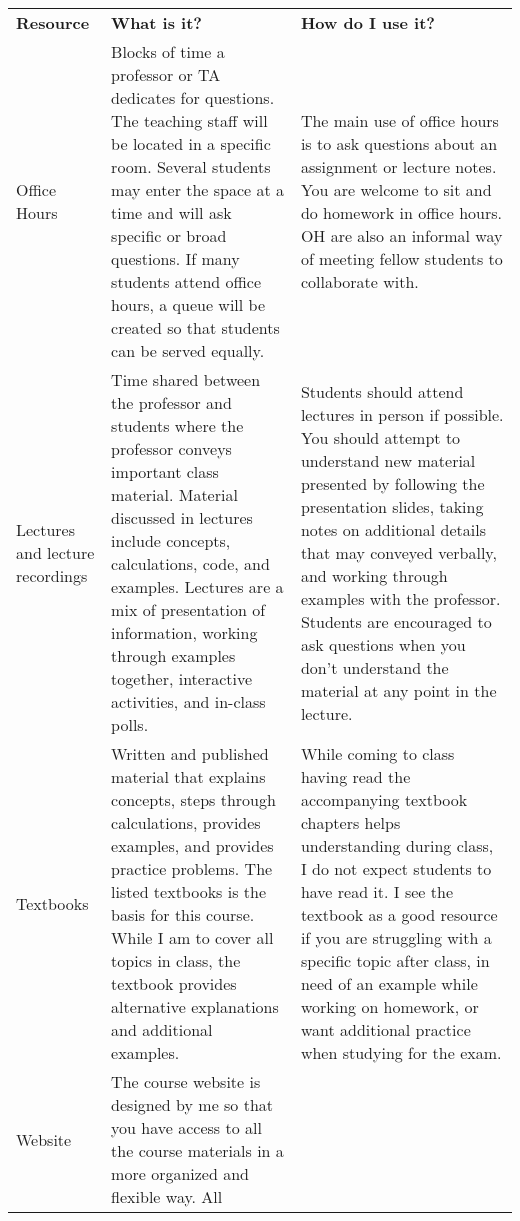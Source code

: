 \documentclass[
  letterpaper,
  DIV=11,
  numbers=noendperiod]{scrartcl}
\begin{document}
\begin{longtable}[]{@{}
  >{\centering\arraybackslash}p{}
  >{\raggedright\arraybackslash}p{}
  >{\raggedright\arraybackslash}p{}@{}}
\toprule\noalign{}
\endhead
\bottomrule\noalign{}
\endlastfoot
\textbf{Resource} & \textbf{What is it?} & \textbf{How do I use it?} \\
Office Hours & Blocks of time a professor or TA dedicates for questions.
The teaching staff will be located in a specific room. Several students
may enter the space at a time and will ask specific or broad questions.
If many students attend office hours, a queue will be created so that
students can be served equally. & The main use of office hours is to ask
questions about an assignment or lecture notes. You are welcome to sit
and do homework in office hours. OH are also an informal way of meeting
fellow students to collaborate with. \\
Lectures and lecture recordings & Time shared between the professor and
students where the professor conveys important class material. Material
discussed in lectures include concepts, calculations, code, and
examples. Lectures are a mix of presentation of information, working
through examples together, interactive activities, and in-class polls. &
Students should attend lectures in person if possible. You should
attempt to understand new material presented by following the
presentation slides, taking notes on additional details that may
conveyed verbally, and working through examples with the professor.
Students are encouraged to ask questions when you don't understand the
material at any point in the lecture. \\
Textbooks & Written and published material that explains concepts, steps
through calculations, provides examples, and provides practice problems.
The listed textbooks is the basis for this course. While I am to cover
all topics in class, the textbook provides alternative explanations and
additional examples. & While coming to class having read the
accompanying textbook chapters helps understanding during class, I do
not expect students to have read it. I see the textbook as a good
resource if you are struggling with a specific topic after class, in
need of an example while working on homework, or want additional
practice when studying for the exam. \\
Website & The course website is designed by me so that you have access
to all the course materials in a more organized and flexible way. All

\end{longtable}
\end{document}
